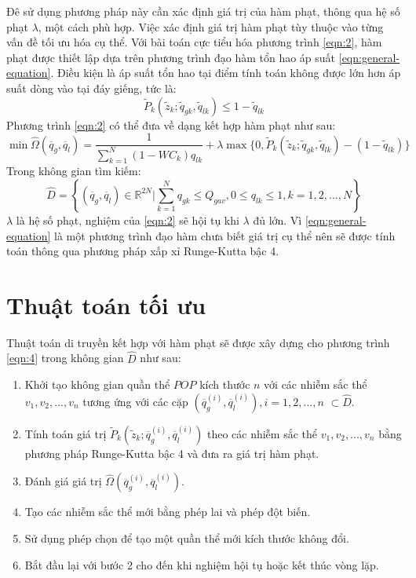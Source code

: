\documentclass[12pt,a4paper]{report}
\begin{document}
Đê sử dụng phương pháp này cần xác định giá trị của hàm phạt, thông qua hệ số phạt $\lambda$, một cách phù hợp. Việc xác định giá trị hàm phạt tùy thuộc vào từng vấn đề tối ưu hóa cụ thể. Với bài toán cực tiểu hóa phương trình \ref{eqn:2}, hàm phạt được thiết lập dựa trên phương trình đạo hàm tổn hao áp suất \ref{eqn:general-equation}. Điều kiện là áp suất tổn hao tại điểm tính toán không được lớn hơn áp suất dòng vào tại đáy giếng, tức là:
	\begin{equation}
		\widetilde{P}_k(\widetilde{z}_k; \widetilde{q}_{gk}, \widetilde{q}_{lk}) \leq 1 - \widetilde{q}_{lk}
	\end{equation}
Phương trình \ref{eqn:2} có thể đưa về dạng kết hợp hàm phạt như sau:
	\begin{equation}\label{eqn:4}
		\min \widehat \Omega(\overline q_g, \overline q_l) = \dfrac{1}{\sum_{k=1}^N(1 - WC_k)q_{lk}} + \lambda\max\{0, \widetilde{P}_k(\widetilde{z}_k; \widetilde{q}_{gk}, \widetilde{q}_{lk}) - (1 - \widetilde{q}_{lk})\}
	\end{equation}
Trong không gian tìm kiếm:
	\begin{equation}\label{eqn:5}
		\widehat D = \left\{(\overline q_g, \overline q_l) \in \mathbb{R}^{2N} |\sum_{k=1}^Nq_{gk} \leq Q_{gav}, 0 \leq q_{lk} \leq 1, k = 1,2,...,N\right\}
	\end{equation}
$\lambda$ là hệ số phạt, nghiệm của \ref{eqn:2} sẽ hội tụ khi $\lambda$ đủ lớn. Vì \ref{eqn:general-equation} là một phương trình đạo hàm chưa biết giá trị cụ thể nên sẽ được tính toán thông qua phương pháp xấp xỉ Runge-Kutta bậc 4.\\

\section{Thuật toán tối ưu}
Thuật toán di truyền kết hợp với hàm phạt sẽ được xây dựng cho phương trình \ref{eqn:4} trong không gian $\widehat D$ như sau:
	\begin{enumerate}
	 	\item Khởi tạo không gian quần thể $POP$ kích thước $n$ với các nhiễm sắc thể $v_1, v_2,...,v_n$ tương ứng với các cặp {$(\overline q_g^{(i)}, \overline q_l^{(i)}), i = 1,2,...,n$} $\subset \widehat D$.
	 	\item Tính toán giá trị $\widetilde{P}_k(\widetilde{z}_k; \overline q_g^{(i)}, \overline q_l^{(i)})$ theo các nhiễm sắc thể $v_1, v_2,...,v_n$ bằng phương pháp Runge-Kutta bậc 4 và đưa ra giá trị hàm phạt.
	 	\item Đánh giá giá trị $\widehat \Omega(\overline q_g^{(i)}, \overline q_l^{(i)})$.
	 	\item Tạo các nhiễm sắc thể mới bằng phép lai và phép đột biến.
	 	\item Sử dụng phép chọn để tạo một quần thể mới kích thước không đổi.
	 	\item Bắt đầu lại với bước 2 cho đến khi nghiệm hội tụ hoặc kết thúc vòng lặp.
	\end{enumerate} 
\end{document}
